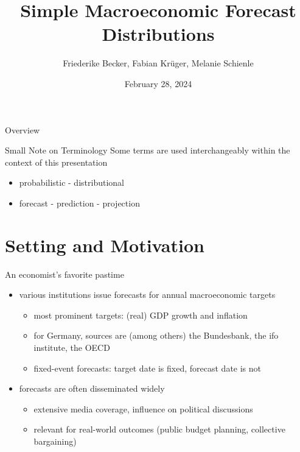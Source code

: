\documentclass[en]{sdqbeamer}
\title[Simple Prediction Intervals]{Simple Macroeconomic Forecast Distributions}
\author[Friederike Becker, Fabian Krüger, Melanie Schienle]{Friederike Becker, Fabian Krüger, Melanie Schienle}
\date[28.\,02.\,2024]{February 28, 2024}
\begin{document}
 
\KITtitleframe

\begin{frame}{Overview}
\tableofcontents
\end{frame}

\begin{frame}{Small Note on Terminology}
Some terms are used interchangeably within the context of this presentation
\begin{itemize}
\item probabilistic - distributional
\item forecast - prediction - projection 
\end{itemize}
\end{frame}


\section{Setting and Motivation}


\begin{frame}{An economist's favorite pastime}
	\begin{itemize}
	    \item various institutions issue forecasts for annual macroeconomic targets
     \begin{itemize}
        \item most prominent targets: (real) GDP growth and inflation
        \item for Germany, sources are (among others) the Bundesbank, the ifo institute, the OECD
         \item fixed-event forecasts: target date is fixed, forecast date is not
     \end{itemize}
     \item forecasts are often disseminated widely
     \begin{itemize}
         \item extensive media coverage, influence on political discussions
         \item relevant for real-world outcomes (public budget planning, collective bargaining)
     \end{itemize}
	\end{itemize}
\end{frame}
\end{document}
